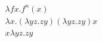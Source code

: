 \begin{gather*}
    \lambda fx . f^n(x) \\
    \lambda x. (\lambda yz. zy) (\lambda yz. zy) x \\
    x \lambda yz. zy
\end{gather*}